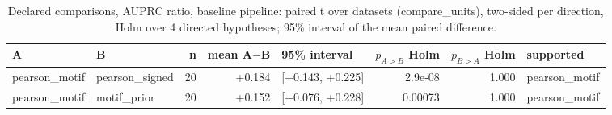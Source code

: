 \begin{table}[H]\centering\small
\caption{Declared comparisons, AUPRC ratio, baseline pipeline: paired t over datasets (compare\_units), two-sided per direction, Holm over 4 directed hypotheses; 95\% interval of the mean paired difference.}
\begin{tabular}{llrrlrrl}\toprule
A & B & n & mean A$-$B & 95\% interval & $p_{A>B}$ Holm & $p_{B>A}$ Holm & supported \\ \midrule
pearson\_motif & pearson\_signed & 20 & +0.184 & [+0.143, +0.225] & 2.9e-08 & 1.000 & pearson\_motif \\
pearson\_motif & motif\_prior & 20 & +0.152 & [+0.076, +0.228] & 0.00073 & 1.000 & pearson\_motif \\
\bottomrule\end{tabular}\end{table}
